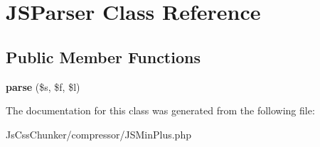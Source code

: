 \hypertarget{class_j_s_parser}{
\section{JSParser Class Reference}
\label{class_j_s_parser}
}
\subsection*{Public Member Functions}
\begin{DoxyCompactItemize}
\item 
\hypertarget{class_j_s_parser_a1447eab39caa71ba67b5c8605d8b1172}{
{\bfseries parse} (\$s, \$f, \$l)}
\label{class_j_s_parser_a1447eab39caa71ba67b5c8605d8b1172}

\end{DoxyCompactItemize}


The documentation for this class was generated from the following file:\begin{DoxyCompactItemize}
\item 
JsCssChunker/compressor/JSMinPlus.php\end{DoxyCompactItemize}

